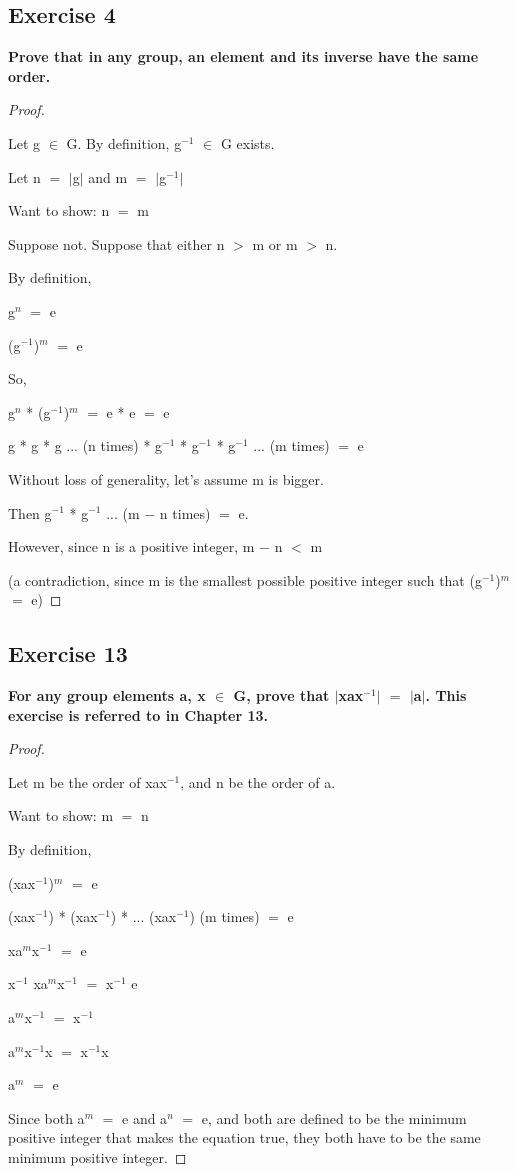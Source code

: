 \documentclass{article}
\newcommand{\mt}[1]{\ensuremath{#1}}
\newcommand\ssc[2][\DefaultOpt]{%
  \def\DefaultOpt{#2}%
  \subsection[#1]{#2}%
}
\newcommand{\bgpf}{\begin{proof} $ $\newline}
\newcommand{\epf}{\end{proof}}
\newcommand{\mem}{\mt{\in} }
\newcommand{\av}[1]{\mt{|}#1\mt{|}}  %
\newcommand{\prn}[1]{(#1)}
\newcommand{\ms}{\mt{-} }
\newcommand{\ls}{\mt{<} }
\newcommand{\gr}{\mt{>} }
\newcommand{\eql}{\mt{=} }
\newcommand{\uf}[2]{#1\mt{^{#2}}}
\begin{document}
\ssc{Exercise 4}{

\textbf{Prove that in any group, an element and its inverse have the same order.}

\bgpf

Let g \mem G. By definition, \uf{g}{-1} \mem G exists.

Let n \eql \av{g} and m \eql \av{\uf{g}{-1}}

Want to show: n \eql m

Suppose not. Suppose that either n \gr m or m \gr n.

By definition,

\uf{g}{n} \eql e

\uf{(\uf{g}{-1})}{m} \eql e

So,

\uf{g}{n} * \uf{(\uf{g}{-1})}{m} \eql e * e \eql e

g * g * g ... (n times) * \uf{g}{-1} * \uf{g}{-1} * \uf{g}{-1} ... (m times) \eql e

Without loss of generality, let's assume m is bigger.

Then \uf{g}{-1} * \uf{g}{-1} ... (m \ms n times) \eql e.

However, since n is a positive integer, m \ms n \ls m

(a contradiction, since m is the smallest possible positive integer such that (\uf{g}{-1})$^m$ \eql e)



\epf

}
\ssc{Exercise 13}{

\textbf{For any group elements a, x \mem G, prove that \av{xa\uf{x}{-1}} \eql \av{a}. This exercise is referred to in Chapter 13.}

\bgpf

Let m be the order of xa\uf{x}{-1}, and n be the order of a.

Want to show: m \eql n

By definition,

\prn{xa\uf{x}{-1}}$^m$ \eql e

\prn{xa\uf{x}{-1}} * \prn{xa\uf{x}{-1}} * ... \prn{xa\uf{x}{-1}} (m times) \eql e

x\uf{a}{m}\uf{x}{-1} \eql e

\uf{x}{-1} x\uf{a}{m}\uf{x}{-1} \eql \uf{x}{-1} e

\uf{a}{m}\uf{x}{-1} \eql \uf{x}{-1}

\uf{a}{m}\uf{x}{-1}x \eql \uf{x}{-1}x

\uf{a}{m} \eql e

Since both \uf{a}{m} \eql e and \uf{a}{n} \eql e, and both are defined to be the minimum positive integer that makes the equation true, they both have to be the same minimum positive integer.

\epf

}
\end{document}
